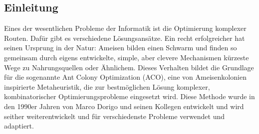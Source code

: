 \documentclass[pdftex,
               12pt,
               DIV=12,
               a4paper,
               twoside,
               parskip=half,
               abstract=true,
               dvipsnames]{scrartcl}
\begin{document}
\subsection{Einleitung}
Eines der wesentlichen Probleme der Informatik ist die Optimierung komplexer Routen. Daf\"ur gibt es verschiedene L\"osungsans\"atze. Ein recht erfolgreicher hat seinen Ursprung in der Natur: Ameisen bilden einen Schwarm und finden so gemeinsam durch eigens entwickelte, simple, aber clevere Mechanismen k\"urzeste Wege zu Nahrungsquellen oder \"Ahnlichem. Dieses Verhalten bildet die Grundlage f\"ur die sogenannte Ant Colony Optimization (ACO), eine von Ameisenkolonien inspirierte Metaheuristik, die zur bestm\"oglichen L\"osung komplexer, kombinatorischer Optimierungsprobleme eingesetzt wird. Diese Methode wurde in den 1990er Jahren von Marco Dorigo und seinen Kollegen entwickelt und wird seither weiterentwickelt und f\"ur verschiedenste Probleme verwendet und adaptiert. \cite[vgl.][]{DorigoStuetzle04}
\end{document}
